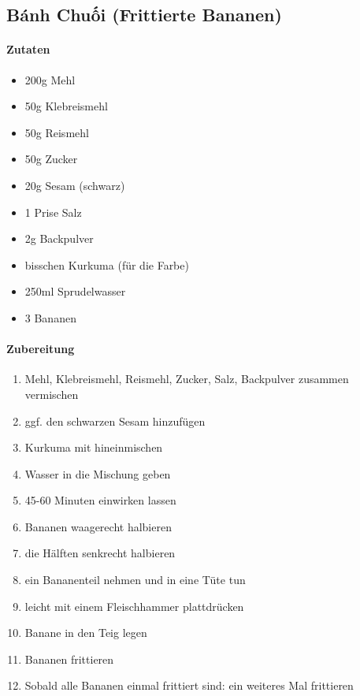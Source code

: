 \newpage
{}
\subsection{Bánh Chuối (Frittierte Bananen)}
\paragraph{Zutaten}
\begin{itemize}[noitemsep]
\item 200g Mehl
\item 50g Klebreismehl
\item 50g Reismehl
\item 50g Zucker
\item 20g Sesam (schwarz)
\item 1 Prise Salz
\item 2g Backpulver
\item bisschen Kurkuma (für die Farbe)
\item 250ml Sprudelwasser
\item 3 Bananen
\end{itemize}
\paragraph{Zubereitung}
\begin{enumerate}[noitemsep]
\item Mehl, Klebreismehl, Reismehl, Zucker, Salz, Backpulver zusammen vermischen
\item ggf. den schwarzen Sesam hinzufügen
\item Kurkuma mit hineinmischen
\item Wasser in die Mischung geben
\item 45-60 Minuten einwirken lassen
\vspace{0.5cm}
\item Bananen waagerecht halbieren
\item die Hälften senkrecht halbieren
\item ein Bananenteil nehmen und in eine Tüte tun
\item leicht mit einem Fleischhammer plattdrücken 
\item Banane in den Teig legen
\item Bananen frittieren
\item Sobald alle Bananen einmal frittiert sind: ein weiteres Mal frittieren
\end{enumerate}
